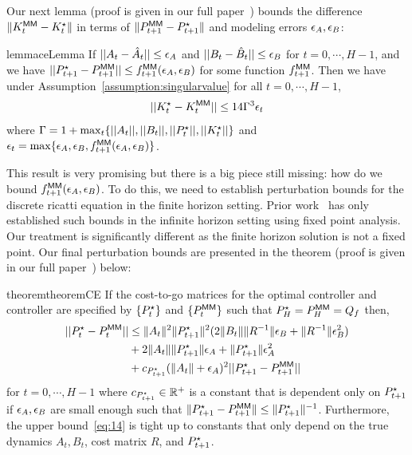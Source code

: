 Our next
lemma (proof is given in our full paper~\cite{DBLP:journals/corr/abs-2111-09434}) bounds the difference $\|K^\mathsf{MM}_t - K^\star_t\|$ in terms of
$\|P^\mathsf{MM}_{t+1} - P^\star_{t+1}\|$ and modeling errors $\epsilon_A, \epsilon_B$:
\begin{restatable}{lemma}{ceLemma}
  \label{lemma:ce}
  If $||A_{t} - \hat{A}_{t}|| \leq \epsilon_A$ and
  $||B_{t} - \hat{B}_{t}|| \leq \epsilon_B$ for $t=0, \cdots, H-1$, and we have
  $||P^\star_{t+1} - P^\mathsf{MM}_{t+1}|| \leq f^\mathsf{MM}_{t+1}(\epsilon_A, \epsilon_B)$ for some function
  $f^\mathsf{MM}_{t+1}$. Then we have under
  Assumption~\ref{assumption:singularvalue} for all $t=0, \cdots, H-1$,
  \begin{align}
    ||K^\star_{t} - K^\mathsf{MM}_{t}|| \leq 14\Gamma^3\epsilon_t
    \label{eq:ce-k-diff}
  \end{align}
  where
  $\Gamma = 1 + \max_{t}\{||A_{t}||, ||B_{t}||, ||P^\star_{t}||, ||K^\star_{t}||\}$
  and $\epsilon_{t} = \max\{\epsilon_A, \epsilon_B, f^\mathsf{MM}_{t+1}(\epsilon_A, \epsilon_B)\}$.
\end{restatable}
This result is very promising but there is a big piece still missing: how do we
bound $f^\mathsf{MM}_{t+1}(\epsilon_A, \epsilon_B)$. To do this, we need to establish perturbation
bounds for the discrete ricatti equation in the finite
horizon setting. Prior work~\cite{konstantinov93, mania19} has only established such
bounds in the infinite horizon setting using fixed point analysis. Our treatment
is significantly different as the finite horizon solution is not a fixed point.
Our final perturbation bounds are presented in the theorem (proof is
given in our full paper~\cite{DBLP:journals/corr/abs-2111-09434}) below:
\begin{restatable}{theorem}{theoremCE}
  \label{theorem:ce}
  If the cost-to-go matrices for the optimal controller and \MM{}
  controller are specified by $\{P^\star_t\}$ and $\{P^\mathsf{MM}_t\}$ such that
  $P^\star_H = P^\mathsf{MM}_H = Q_f$ then,
  \begin{align}
    \label{eq:14}
    ||P^\star_{t} - P^\mathsf{MM}_{t}|| &\leq  \|A_{t}\|^{2}\|P^\star_{t+1}\|^{2}(2\|B_{t}\|\|R^{-1}\|\epsilon_B + \|R^{-1}\|\epsilon_B^{2}) \nonumber\\
    &+ 2\|A_{t}\|\|P^\star_{t+1}\|\epsilon_A + \|P^\star_{t+1}\|\epsilon_A^{2} \nonumber\\
                        &+ c_{P^\star_{t+1}}(\|A_{t}\|+ \epsilon_A)^{2}||P^\star_{t+1} - P^\mathsf{MM}_{{t+1}}||
  \end{align}
  for $t=0, \cdots, H-1$ where $c_{P^\star_{t+1}} \in \mathbb{R}^+$  is a constant that is
  dependent only on $P^\star_{t+1}$ if $\epsilon_A, \epsilon_B$ are small enough such
  that $\|P^\star_{t+1} - P^\mathsf{MM}_{t+1}\| \leq \|P^\star_{t+1}\|^{-1}$. Furthermore, the upper
  bound~\eqref{eq:14} is tight up to constants that only depend on the
  true dynamics $A_t, B_t$, cost matrix $R$, and $P^\star_{t+1}$.
\end{restatable}

